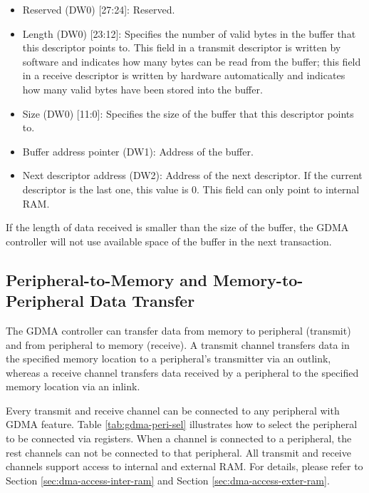 \documentclass[main\_\_EN.tex]{subfiles}
\begin{document}
\begin{itemize}
    \item Reserved (DW0) [27:24]: Reserved.
    \item Length (DW0) [23:12]: Specifies the number of valid bytes in the buffer that this descriptor points to. This field in a transmit descriptor is written by software and indicates how many bytes can be read from the buffer; this field in a receive descriptor is written by hardware automatically and indicates how many valid bytes have been stored into the buffer.
    \item Size (DW0) [11:0]: Specifies the size of the buffer that this descriptor points to.
    \item Buffer address pointer (DW1): Address of the buffer.
    \item Next descriptor address (DW2): Address of the next descriptor. If the current descriptor is the last one, this value is 0. This field can only point to internal RAM.
\end{itemize}

If the length of data received is smaller than the size of the buffer, the GDMA controller will not use available space of the buffer in the next transaction.

\subsection{Peripheral-to-Memory and Memory-to-Peripheral Data Transfer}

The GDMA controller can transfer data from memory to peripheral (transmit) and from peripheral to memory (receive). A transmit channel transfers data in the specified memory location to a peripheral's transmitter via an outlink, whereas a receive channel transfers data received by a peripheral to the specified memory location via an inlink.

Every transmit and receive channel can be connected to any peripheral with GDMA feature. Table \ref{tab:gdma-peri-sel} illustrates how to select the peripheral to be connected via registers. When a channel is connected to a peripheral, the rest channels can not be connected to that peripheral. All transmit and receive channels support access to internal and external RAM. For details, please refer to Section \ref{sec:dma-access-inter-ram} and Section \ref{sec:dma-access-exter-ram}.
\end{document}
